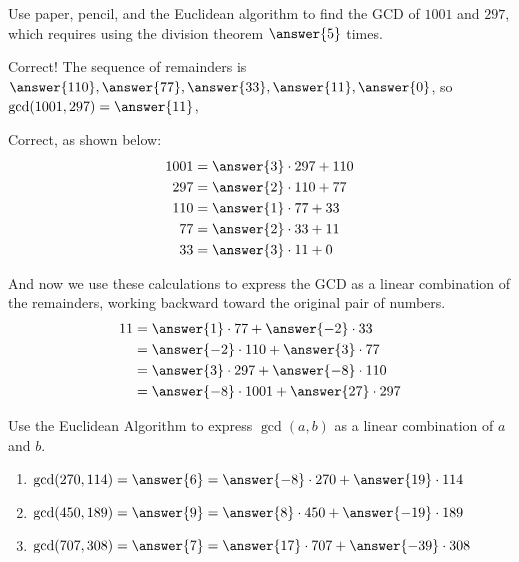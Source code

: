 \documentclass[space,nooutcomes]{ximera}
\begin{document}
\begin{problem}
Use paper, pencil, and the Euclidean algorithm to find the GCD of $1001$ and $297$, which requires using the 
division theorem $\answer{5}$ times.  
\begin{problem}
Correct!  The sequence of remainders is $\answer{110}, \answer{77}, \answer{33}, \answer{11}, \answer{0}$, so $\gcd(1001,297) = \answer{11}$, 
\begin{problem}
Correct, as shown below:  
\begin{align}
\label{eqc1}1001 & = \answer{3}\cdot 297 + 110 \\  
\label{eqc2}  297 &= \answer{2}\cdot 110 + 77 \\
\label{eqc3}  110 &= \answer{1}\cdot 77 + 33 \\\
\label{eqc4}   77  &= \answer{2}\cdot 33 + 11 \\ 
             33  &= \answer{3}\cdot 11 + 0
 \end{align}

And now we use these calculations to express the GCD as a linear combination of the remainders, working backward toward the original pair of numbers.  
\begin{align*}
11 & = \answer{1}\cdot 77 + \answer{-2} \cdot 33 \\  
    &= \answer{-2}\cdot 110 + \answer{3} \cdot 77 \\
    &= \answer{3}\cdot 297 + \answer{-8} \cdot 110 \\\
    &= \answer{-8}\cdot 1001 + \answer{27} \cdot 297 \\ 
 \end{align*}

\end{problem}
\end{problem}
\end{problem}

\begin{problem}
Use the Euclidean Algorithm to express $\gcd(a,b)$ as a linear combination of $a$ and $b$.   
\begin{enumerate}
\item $\gcd(270,114) = \answer{6} = \answer{-8} \cdot 270 + \answer{19} \cdot 114$
\item $\gcd(450,189) = \answer{9} = \answer{8}\cdot 450 + \answer{-19}\cdot 189$
\item $\gcd(707,308) = \answer{7} = \answer{17} \cdot 707 + \answer{-39} \cdot 308$
\end{enumerate}
\end{problem}
\end{document}
